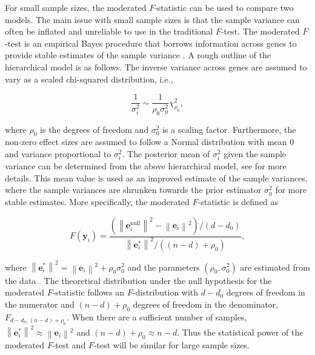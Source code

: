 \documentclass[11pt]{article}
\begin{document}
For small sample sizes, the moderated $F$-statistic can be used to compare two models. The main issue with small sample sizes is that the sample variance can often be inflated and unreliable to use in the traditional $F$-test. The moderated $F$-test is an empirical Bayes procedure that borrows information across genes to provide stable estimates of the sample variance \citep{smyth2004linear}. A rough outline of the hierarchical model is as follows. The inverse variance across genes are assumed to vary as a scaled chi-squared distribution, i.e.,

\begin{equation}
\frac{1}{\sigma_{i}^{2}} \sim \frac{1}{\rho_{0}\sigma_{0}^{2}} \chi_{\rho_{0}}^{2},
\end{equation}

\noindent where $\rho_{0}$ is the degrees of freedom and $\sigma_{0}^{2}$ is a scaling factor. Furthermore, the non-zero effect sizes are assumed to follow a Normal distribution with mean 0 and variance proportional to $\sigma_{i}^{2}$. The posterior mean of $\sigma_{i}^{2}$ given the sample variance can be determined from the above hierarchical model, see \cite{smyth2004linear} for more details. This mean value is used as an improved estimate of the sample variances, where the sample variances are shrunken towards the prior estimator $\sigma_{0}^{2}$ for more stable estimates. More specifically, the moderated $F$-statistic is defined as

\begin{equation}
F(\mathbf{y}_{i}) = \dfrac{\left(\left\lVert \mathbf{e}^{\text{null}}_{i}\right\rVert ^{2}-\left\lVert \mathbf{e}_{i} \right\rVert ^ {2} \right)/(d-d_{0})}{\left\lVert \mathbf{e}_{i}^{*} \right\rVert ^ {2}/((n-d) + \rho_{0})},
\end{equation}

\noindent where $\left\lVert\mathbf{e}^{*}_{i}\right\rVert ^ {2} = \left\lVert \mathbf{e}_{i} \right\rVert ^ {2} + \rho_{0}\sigma_{0}^{2}$ and the parameters $(\rho_{0}, \sigma_{0}^{2})$ are estimated from the data \citep{smyth2004linear}. The theoretical distribution under the null hypothesis for the moderated $F$-statistic follows an $F$-distribution with $d-d_{0}$ degrees of freedom in the numerator and $(n-d) + \rho_{0}$ degrees of freedom in the denominator, $F_{d-d_{0},(n-d)+\rho_{0}}$. When there are a sufficient number of samples, $\left\lVert\mathbf{e}^{*}_{i}\right\rVert ^ {2} \approx \left\lVert \mathbf{e}_{i} \right\rVert ^ {2}$ and $(n-d) + \rho_{0} \approx n-d$. Thus the statistical power of the moderated $F$-test and $F$-test will be similar for large sample sizes.
\end{document}
